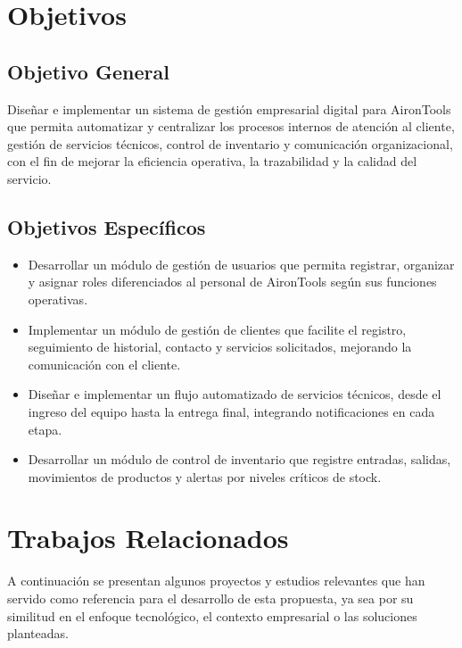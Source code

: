 \section{Objetivos}

\subsection{Objetivo General}

Diseñar e implementar un sistema de gestión empresarial digital para AironTools que permita automatizar y centralizar los procesos internos de atención al cliente, gestión de servicios técnicos, control de inventario y comunicación organizacional, con el fin de mejorar la eficiencia operativa, la trazabilidad y la calidad del servicio.

\subsection{Objetivos Específicos}

\begin{itemize}
    \item Desarrollar un módulo de gestión de usuarios que permita registrar, organizar y asignar roles diferenciados al personal de AironTools según sus funciones operativas.
    
    \item Implementar un módulo de gestión de clientes que facilite el registro, seguimiento de historial, contacto y servicios solicitados, mejorando la comunicación con el cliente.
    
    \item Diseñar e implementar un flujo automatizado de servicios técnicos, desde el ingreso del equipo hasta la entrega final, integrando notificaciones en cada etapa.
    
    \item Desarrollar un módulo de control de inventario que registre entradas, salidas, movimientos de productos y alertas por niveles críticos de stock.
\end{itemize}

\section{Trabajos Relacionados}

A continuación se presentan algunos proyectos y estudios relevantes que han servido como referencia para el desarrollo de esta propuesta, ya sea por su similitud en el enfoque tecnológico, el contexto empresarial o las soluciones planteadas.

